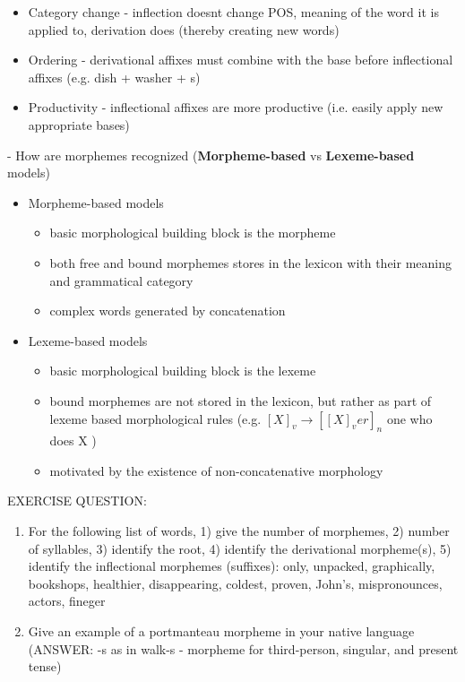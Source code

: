 \documentclass[11pt]{article}
\begin{document}
\begin{itemize}
 \item Category change - inflection doesnt change POS, meaning of the word it is applied to, derivation does (thereby creating new words)
 \item Ordering - derivational affixes must combine with the base before inflectional affixes (e.g. dish + washer + s)
 \item Productivity - inflectional affixes are more productive (i.e. easily apply new appropriate bases)
\end{itemize}
- How are morphemes recognized ({\bf Morpheme-based} vs {\bf Lexeme-based} models)
\begin{itemize}
 \item Morpheme-based models
  \begin{itemize}
   \item basic morphological building block is the morpheme
   \item both free and bound morphemes stores in the lexicon with their meaning and grammatical category
   \item complex words generated by concatenation
  \end{itemize}
 \item Lexeme-based models
  \begin{itemize}
   \item basic morphological building block is the lexeme
   \item bound morphemes are not stored in the lexicon, but rather as part of lexeme based morphological rules (e.g. $[X]_v \rightarrow [[X]_v er]_n$ one who does X ) 
   \item motivated by the existence of non-concatenative morphology
  \end{itemize}
\end{itemize}
EXERCISE QUESTION:

\begin{enumerate}
 \item For the following list of words, 1) give the number of morphemes, 2) number of syllables, 3) identify the root, 4) identify the derivational morpheme(s), 5) identify the inflectional morphemes (suffixes): only, unpacked, graphically, bookshops, healthier, disappearing, coldest, proven, John's, mispronounces, actors, fineger
 \item Give an example of a portmanteau morpheme in your native language (ANSWER: -s as in walk-s - morpheme for third-person, singular, and present tense)
\end{enumerate}
\end{document}
